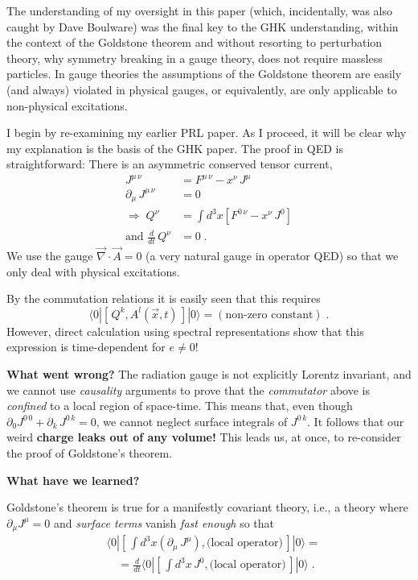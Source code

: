 \documentclass[letterpaper,twoside,preprintnumbers,slac_one]{revtex4}
\newcommand{\pa}{\partial}
\newcommand{\comm}[2]{\left[\,#1,#2\,\right]}
\newcommand{\ipop}[3]{\ensuremath{\langle#1 | #2 | #3\rangle}\xspace}
\begin{document}
The understanding of my oversight in this paper (which, incidentally,
was also caught by Dave Boulware) was the final key to the GHK
understanding, within the context of the Goldstone theorem and without
resorting to perturbation theory, why symmetry breaking in a gauge
theory, does not require massless particles. In gauge theories the
assumptions of the Goldstone theorem are easily (and always) violated in physical
gauges, or equivalently, are only applicable to non-physical
excitations.

I begin by re-examining my earlier PRL paper. As I proceed, it will be
clear why my explanation is the basis of the GHK paper. The proof in
QED is straightforward: There is an asymmetric conserved tensor
current,
\begin{align*}
  J^{\mu\, \nu} &= F^{\mu\, \nu} - x^{\nu}\, J^{\mu} \\
  \pa_{\mu}\, J^{\mu\, \nu} &= 0 \\
  \Rightarrow\; Q^{\nu} &= \int d^3x \left[ F^{0\, \nu} - x^{\nu}\, J^0 \right] \\
  \text{and } \frac{d}{dt}\, Q^{\nu} &= 0 \; .
\end{align*}
We use the gauge $\vec\nabla\cdot\vec{A} = 0$ (a very natural gauge
in operator QED) so that we only deal with physical excitations.

By the commutation relations it is easily seen that this requires
\begin{equation*}
  \ipop{0}{\comm{Q^{k}}{A^{l}(\vec{x}, t)}}{0} = (\text{non-zero constant}) \; .
\end{equation*}
However, direct calculation using spectral representations show that
this expression is time-dependent for $e \neq 0$!


\textbf{What went wrong?} The radiation gauge is not explicitly
Lorentz invariant, and we cannot use \emph{causality} arguments to
prove that the \emph{commutator} above is \emph{confined} to a local
region of space-time. This means that, even though $\pa_{0} J^{0\, 0} + \pa_{k} \, J^{0\, k}
= 0$, we cannot  neglect surface integrals of $J^{0\, k}$. It follows
that our weird  \textbf{charge  leaks out of any volume!} This leads us, at
once, to re-consider the proof of Goldstone's theorem.


\textbf{What have we learned?}

Goldstone's theorem is true for a manifestly covariant theory,
i.e., a theory where $\pa_{\mu} J^{\mu} = 0$ and \emph{surface terms}
vanish \emph{fast enough} so that
\begin{equation*}
  \begin{split}
    & \ipop{0}{\comm{\int d^3x (\pa_{\mu}\, J^{\mu})}{\text{(local operator)}}}{0} = \\
    &\quad = \frac{d}{dt}\ipop{0}{\comm{\int d^3x\, J^0}{\text{(local operator)}}}{0} \; .
  \end{split}
\end{equation*}
\end{document}
